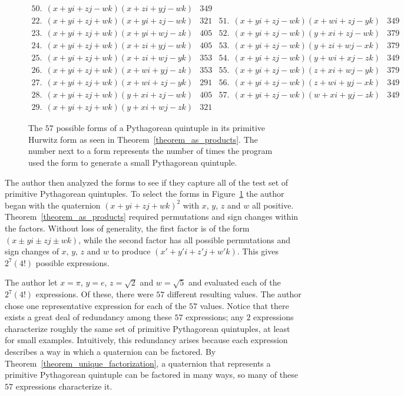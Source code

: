 \documentclass[12pt,table]{article}
\theoremstyle{definition}
\theoremstyle{remark}
\numberwithin{equation}{section}
\begin{document}
\begin{appendices}
\begin{figure}
\[\begin{array}{l|c||l|c}
50. \:\: (x+yi+zj-wk)(x+zi+yj-wk) &349\\
%
22. \:\: (x+yi+zj+wk)(x+yi+zj-wk) &321&
51. \:\: (x+yi+zj-wk)(x+wi+zj-yk) &349\\
%
23. \:\: (x+yi+zj+wk)(x+yi+wj-zk) &405&
52. \:\: (x+yi+zj-wk)(y+xi+zj-wk) &379\\
%
24. \:\: (x+yi+zj+wk)(x+zi+yj-wk) &405&
53. \:\: (x+yi+zj-wk)(y+zi+wj-xk) &379\\
%
25. \:\: (x+yi+zj+wk)(x+zi+wj-yk) &353&
54. \:\: (x+yi+zj-wk)(y+wi+xj-zk) &349\\ [2mm]
%
26. \:\: (x+yi+zj+wk)(x+wi+yj-zk) &353&
55. \:\: (x+yi+zj-wk)(z+xi+wj-yk) &379\\
%
27. \:\: (x+yi+zj+wk)(x+wi+zj-yk) &291&
56. \:\: (x+yi+zj-wk)(z+wi+yj-xk) &349\\
%
28. \:\: (x+yi+zj+wk)(y+xi+zj-wk) &405&
57. \:\: (x+yi+zj-wk)(w+xi+yj-zk) &349\\
%
29. \:\: (x+yi+zj+wk)(y+xi+wj-zk) &321
\end{array}
\]
\caption{The $57$ possible forms of a Pythagorean quintuple in its primitive Hurwitz form as seen in Theorem~\ref{theorem_as_products}. The number next to a form represents the number of times the program used the form to generate a small Pythagorean quintuple.} 
\label{figure_57}
\end{figure}



The author then
analyzed the forms to
see if they
capture all of the test set of primitive Pythagorean quintuples.
To select the forms in Figure~\ref{figure_57}
the author began with the quaternion
$(x + yi + zj + wk)^2$ with 
 $x$, $y$, $z$ and $w$ all positive.
Theorem~\ref{theorem_as_products} required 
permutations and sign changes within the factors.
Without loss of generality, the first factor is
of the form $(x \pm yi \pm zj \pm wk)$,
while the second factor has all possible permutations
and sign changes of
 $x$, $y$, $z$ and $w$ to produce
$(x' + y'i + z'j + w'k)$.
This gives $2^7(4!)$ possible expressions.


The author let $x = \pi$, $y = e$,
$z = \sqrt{2}$ and $w = \sqrt{5}$ and evaluated
each of the $2^7(4!)$ expressions.
Of these, there were $57$ different resulting values.
The author chose one representative expression for each of the
$57$ values. Notice that there exists a great deal of 
redundancy among these $57$ expressions; any $2$ expressions
characterize roughly the same set of primitive
Pythagorean quintuples, at least for small examples. Intuitively,
this redundancy arises because each expression describes a way in which 
a quaternion can be factored. 
By Theorem~\ref{theorem_unique_factorization}, a quaternion that 
represents a primitive Pythagorean quintuple can be factored in many 
ways, so many of these $57$ expressions characterize it.



\end{appendices}
\end{document}
